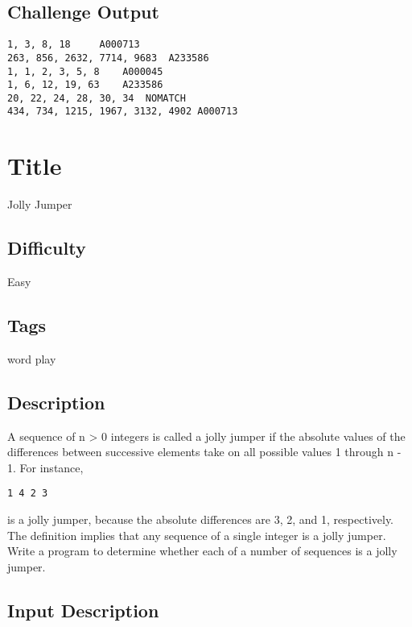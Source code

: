 \subsection{Challenge Output}\label{challenge-output-19}

\begin{verbatim}
1, 3, 8, 18     A000713
263, 856, 2632, 7714, 9683  A233586
1, 1, 2, 3, 5, 8    A000045
1, 6, 12, 19, 63    A233586
20, 22, 24, 28, 30, 34  NOMATCH
434, 734, 1215, 1967, 3132, 4902 A000713
\end{verbatim}

\section{Title}\label{title-29}

Jolly Jumper

\subsection{Difficulty}\label{difficulty-28}

Easy

\subsection{Tags}\label{tags-29}

word play

\subsection{Description}\label{description-29}

A sequence of n \textgreater{} 0 integers is called a jolly jumper if
the absolute values of the differences between successive elements take
on all possible values 1 through n - 1. For instance,

\begin{verbatim}
1 4 2 3
\end{verbatim}

is a jolly jumper, because the absolute differences are 3, 2, and 1,
respectively. The definition implies that any sequence of a single
integer is a jolly jumper. Write a program to determine whether each of
a number of sequences is a jolly jumper.

\subsection{Input Description}\label{input-description-21}

